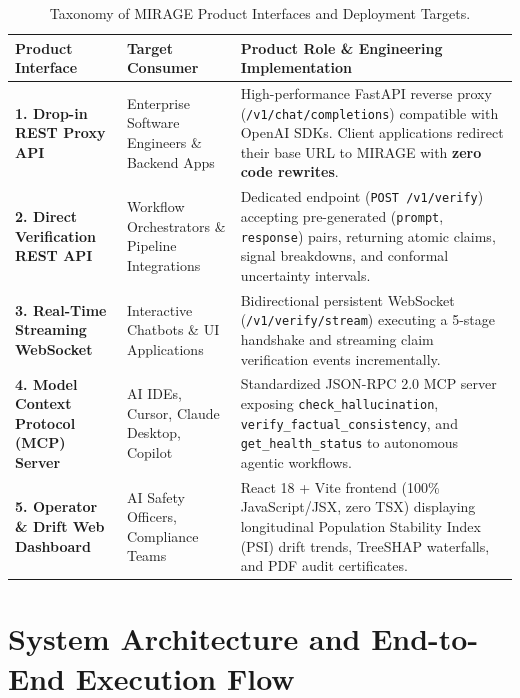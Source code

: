 \documentclass[11pt,a4paper]{article}
\begin{document}
\begin{table}[H]
\centering
\small
\renewcommand{\arraystretch}{1.3}
\begin{tabularx}{\linewidth}{p{3.4cm} p{3.2cm} X}
\toprule
\textbf{Product Interface} & \textbf{Target Consumer} & \textbf{Product Role \& Engineering Implementation} \\
\midrule
\textbf{1. Drop-in REST Proxy API} & Enterprise Software Engineers \& Backend Apps & High-performance FastAPI reverse proxy (\texttt{/v1/chat/completions}) compatible with OpenAI SDKs. Client applications redirect their base URL to MIRAGE with \textbf{zero code rewrites}. \\
\textbf{2. Direct Verification REST API} & Workflow Orchestrators \& Pipeline Integrations & Dedicated endpoint (\texttt{POST /v1/verify}) accepting pre-generated (\texttt{prompt}, \texttt{response}) pairs, returning atomic claims, signal breakdowns, and conformal uncertainty intervals. \\
\textbf{3. Real-Time Streaming WebSocket} & Interactive Chatbots \& UI Applications & Bidirectional persistent WebSocket (\texttt{/v1/verify/stream}) executing a 5-stage handshake and streaming claim verification events incrementally. \\
\textbf{4. Model Context Protocol (MCP) Server} & AI IDEs, Cursor, Claude Desktop, Copilot & Standardized JSON-RPC 2.0 MCP server exposing \texttt{check\_hallucination}, \texttt{verify\_factual\_consistency}, and \texttt{get\_health\_status} to autonomous agentic workflows. \\
\textbf{5. Operator \& Drift Web Dashboard} & AI Safety Officers, Compliance Teams & React 18 + Vite frontend (100\% JavaScript/JSX, zero TSX) displaying longitudinal Population Stability Index (PSI) drift trends, TreeSHAP waterfalls, and PDF audit certificates. \\
\bottomrule
\end{tabularx}
\caption{Taxonomy of MIRAGE Product Interfaces and Deployment Targets.}
\label{tab:product_taxonomy}
\end{table}

\section{System Architecture and End-to-End Execution Flow}
\end{document}
